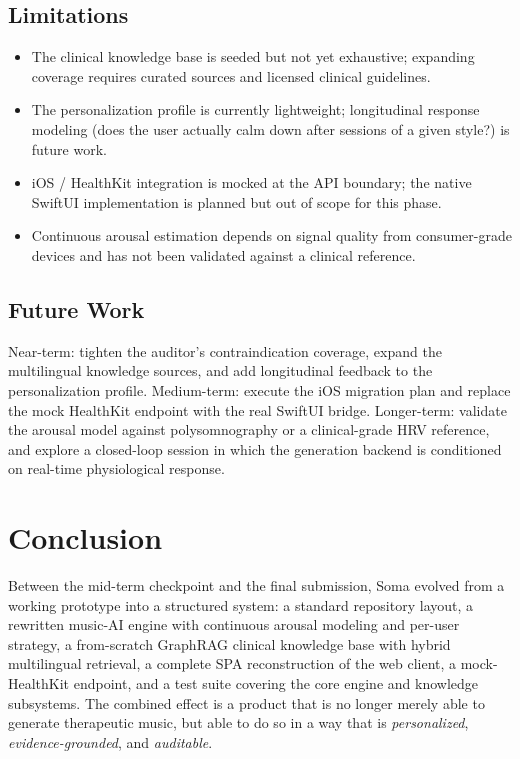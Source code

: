\documentclass[11pt,a4paper]{article}
\begin{document}
\subsection{Limitations}

\begin{itemize}[leftmargin=*]
  \item The clinical knowledge base is seeded but not yet exhaustive; expanding
    coverage requires curated sources and licensed clinical guidelines.
  \item The personalization profile is currently lightweight; longitudinal
    response modeling (does the user actually calm down after sessions of a
    given style?) is future work.
  \item iOS / HealthKit integration is mocked at the API boundary; the native
    SwiftUI implementation is planned but out of scope for this phase.
  \item Continuous arousal estimation depends on signal quality from
    consumer-grade devices and has not been validated against a clinical
    reference.
\end{itemize}

\subsection{Future Work}

Near-term: tighten the auditor's contraindication coverage, expand the
multilingual knowledge sources, and add longitudinal feedback to the
personalization profile. Medium-term: execute the iOS migration plan and
replace the mock HealthKit endpoint with the real SwiftUI bridge.
Longer-term: validate the arousal model against polysomnography or a
clinical-grade HRV reference, and explore a closed-loop session in which the
generation backend is conditioned on real-time physiological response.

\section{Conclusion}

Between the mid-term checkpoint and the final submission, Soma evolved from a
working prototype into a structured system: a standard repository layout, a
rewritten music-AI engine with continuous arousal modeling and per-user
strategy, a from-scratch GraphRAG clinical knowledge base with hybrid
multilingual retrieval, a complete SPA reconstruction of the web client, a
mock-HealthKit endpoint, and a test suite covering the core engine and
knowledge subsystems. The combined effect is a product that is no longer
merely able to generate therapeutic music, but able to do so in a way that is
\emph{personalized}, \emph{evidence-grounded}, and \emph{auditable}.
\end{document}
